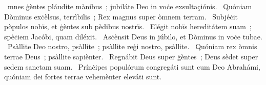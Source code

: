 { }
{%
~mnes ġèntes pláudite mànibus~; jubiláte Deo in voċe exsultaçiónis. 
~Quóniam Dòminus exċèlsus, terrìbilis~; Rex magnus super òmnem terram. 
~Subjéċit pòpulos nobïs, et ġèntes sub pèdibus nostrïs. 
~Elégit nobïs hereditátem suam~; spèċiem Jacóbi, quam diléxit. 
~Asċènsit Deus in júbilo, et Dòminus in voċe tubae. 
~Psàllite Deo nostro, psàllite~; psàllite reġi nostro, psàllite. 
~Quóniam rex òmnis terrae Deus~; psàllite sapiènter. 
~Regnábit Deus super ġèntes~; Deus sèdet super sedem sanctam suam. 
~Prínċipes populórum congregáti sunt cum Deo Abrahámi, quóniam dei fortes terrae vehemènter eleváti sunt. 
}
